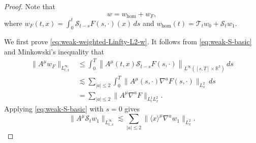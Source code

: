 \documentclass[11pt,twoside]{article}
\def\ls{\lesssim}
\theoremstyle{plain}
\theoremstyle{definition}
\theoremstyle{assumption}
\numberwithin{equation}{section}
\begin{document}
			\begin{proof}
				Note that
				\begin{equation}\label{YHC-36}
					w=w_{\mathrm{hom}}+w_F,
				\end{equation}
				where $w_F(t,x)=\int_0^t
					\mathcal S_{t-s}F(s,\cdot)(x)\,ds$
				and $w_{\mathrm{hom}}(t)
					=\mathcal T_t w_0+\mathcal S_t w_1$.
				
				
				We first prove \eqref{eq:weak-weighted-Linfty-L2-w}. It follows from \eqref{eq:weak-S-basic}
                and Minkowski's inequality that
				\begin{equation}
					\label{eq:weak-Duhamel-w}
					\begin{aligned}
						\|A^\mu w_F\|_{L^\infty_{t,x}}
						&\le
						\int_0^T
						\left\|
						A^\mu(t,x)\mathcal S_{t-s}F(s,\cdot)
						\right\|_{L^\infty([s,T]\times\mathbb R^3)}
						\,ds
						\\
						&\ls
						\sum_{|a|\le2}
						\int_0^T
						\|A^\mu(s,\cdot)\nabla^aF(s,\cdot)\|_{L^2_x}
						\,ds
						\\
						&=
						\sum_{|a|\le2}
						\|A^\mu\nabla^aF\|_{L^1_tL^2_x}.
					\end{aligned}
				\end{equation}
				Applying \eqref{eq:weak-S-basic} with \(s=0\) gives
				\begin{equation}
					\label{eq:weak-St-w1-w}
					\|A^\mu \mathcal S_t w_1\|_{L^\infty_{t,x}}
					\ls
					\sum_{|a|\le2}
					\|\langle x\rangle^\mu\nabla^a w_1\|_{L^2_x}.
				\end{equation}
				

\end{proof}
\end{document}
